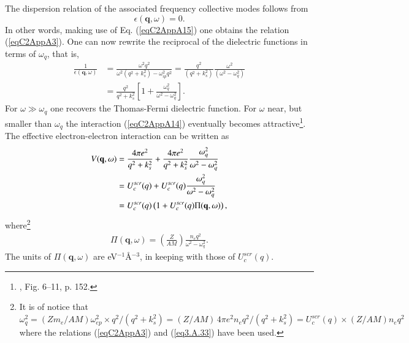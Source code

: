 The dispersion relation of the associated frequency collective modes follows from
\begin{equation}\label{eqC2AppA21}
\epsilon(\mathbf q,\omega)=0.
\end{equation}
In other words, making use of Eq. (\ref{eqC2AppA15}) one obtains the relation (\ref{eqC2AppA3}). One can now rewrite the reciprocal of the dielectric functions in terms of $\omega_{q}$, that is,
\begin{align}\label{eqC2AppA22}
\nonumber \frac{1}{\epsilon(\mathbf q,\omega)}&=\frac{\omega^2q^2}{\omega^2(q^2+k_s^2)-\omega_{ip}^2q^2}=\frac{q^2}{(q^2+k_s^2)}\frac{\omega^2}{(\omega^2-\omega_q^2)}\\
&=\frac{q^2}{q^2+k_s^2}\left[1+\frac{\omega_q^2}{\omega^2-\omega_q^2}\right].
\end{align}
For $\omega\gg \omega_q$ one recovers the Thomas-Fermi dielectric function. For $\omega$ near, but smaller than $\omega_q$ the interaction (\ref{eqC2AppA14}) eventually becomes   attractive\footnote{\cite{Schrieffer:64}, Fig. 6--11, p. 152.}. The effective electron-electron interaction can be  written as
\begin{align}\label{eqC2AppA23}
\nonumber V(\mathbf q,\omega)&=\frac{4\pi  e^2}{q^2+k_s^2}+\frac{4\pi  e^2}{q^2+k_s^2}\frac{\omega_q^2}{\omega^2-\omega_q^2}\\
\nonumber &=U^{scr}_c(q)+U_c^{scr}(q)\frac{\omega_q^2}{\omega^2-\omega_q^2}\\
&=U^{scr}_c(q)\left(1+U^{scr}_c(q)\Pi(\mathbf q,\omega)\right), \idx{Induced pairing interaction!parallel with pairing in superconductors}
\end{align}
where\footnote{It is of notice that $\omega_q^2=\left(Zm_e/AM\right)\omega^2_{ep}\times q^2/(q^2+k_s^2)=(Z/AM)\,4\pi e^2 n_e q^2 /(q^2+k_s^2)=U^{scr}_c(q)\times(Z/AM)n_e q^2$ where the relations (\ref{eqC2AppA3}) and (\ref{eq3.A.33}) have been used.}
\begin{align}\label{eqC2AppA24}
\Pi(\mathbf q,\omega)=\left(\frac{Z}{AM}\right)\frac{n_e q^2}{\omega^2-\omega_q^2}.
\end{align}
The units of $\Pi(\mathbf q,\omega)$ are eV$^{-1}$\AA$^{-3}$, in keeping with those of $U_c^{scr}(q)$.


